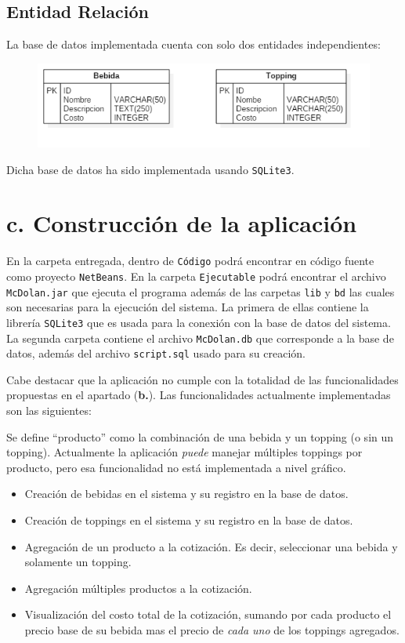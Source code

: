 \documentclass[11pt]{utalcaDoc}
\begin{document}
\subsection*{Entidad Relación}

La base de datos implementada cuenta con solo dos entidades independientes:
\begin{figure}[H]
\includegraphics[scale=0.6]{ER.png}
\end{figure}

Dicha base de datos ha sido implementada usando \texttt{SQLite3}.

\section*{c. Construcción de la aplicación}

En la carpeta entregada, dentro de  \texttt{Código} podrá encontrar en código fuente como proyecto \texttt{NetBeans}. En la carpeta \texttt{Ejecutable} podrá encontrar el archivo \texttt{McDolan.jar} que ejecuta el programa además de las carpetas \texttt{lib} y \texttt{bd} las cuales son necesarias para la ejecución del sistema. La primera de ellas contiene la librería \texttt{SQLite3} que es usada para la conexión con la base de datos del sistema. La segunda carpeta contiene el archivo \texttt{McDolan.db} que corresponde a la base de datos, además del archivo \texttt{script.sql} usado para su creación.

Cabe destacar que la aplicación no cumple con la totalidad de las funcionalidades propuestas en el apartado (\textbf{b.}). Las funcionalidades actualmente implementadas son las siguientes:

Se define ``producto'' como la combinación de una bebida y un topping (o sin un topping). Actualmente la aplicación \textit{puede} manejar múltiples toppings por producto, pero esa funcionalidad no está implementada a nivel gráfico.

\begin{itemize}
\item Creación de bebidas en el sistema y su registro en la base de datos.
\item Creación de toppings en el sistema y su registro en la base de datos.
\item Agregación de un producto a la cotización. Es decir, seleccionar una bebida y solamente un topping.
\item Agregación múltiples productos a la cotización.
\item Visualización del costo total de la cotización, sumando por cada producto el precio base de su bebida mas el precio de \textit{cada uno} de los toppings agregados.
\end{itemize}
\end{document}
